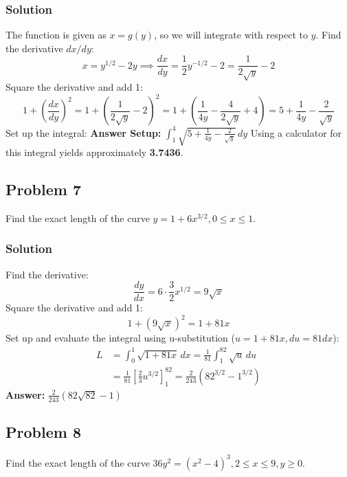 \documentclass{article}
\begin{document}
\subsubsection*{Solution}
The function is given as $ x = g(y) $, so we will integrate with respect to $y$.
Find the derivative $ dx/dy $:
\[ x = y^{1/2} - 2y \implies \frac{dx}{dy} = \frac{1}{2}y^{-1/2} - 2 = \frac{1}{2\sqrt{y}} - 2 \]
Square the derivative and add 1:
\[ 1 + \left(\frac{dx}{dy}\right)^2 = 1 + \left(\frac{1}{2\sqrt{y}} - 2\right)^2 = 1 + \left(\frac{1}{4y} - \frac{4}{2\sqrt{y}} + 4\right) = 5 + \frac{1}{4y} - \frac{2}{\sqrt{y}} \]
Set up the integral:
\textbf{Answer Setup:} $ \int_{1}^{4} \sqrt{5 + \frac{1}{4y} - \frac{2}{\sqrt{y}}} \,dy $
Using a calculator for this integral yields approximately \textbf{3.7436}.

\subsection{Problem 7}
Find the exact length of the curve $ y = 1 + 6x^{3/2}, 0 \le x \le 1 $.
\subsubsection*{Solution}
Find the derivative:
\[ \frac{dy}{dx} = 6 \cdot \frac{3}{2}x^{1/2} = 9\sqrt{x} \]
Square the derivative and add 1:
\[ 1 + (9\sqrt{x})^2 = 1 + 81x \]
Set up and evaluate the integral using u-substitution ($ u = 1+81x, du = 81dx $):
\begin{align*}
    L &= \int_{0}^{1} \sqrt{1+81x} \,dx = \frac{1}{81} \int_{1}^{82} \sqrt{u} \,du \\
    &= \frac{1}{81} \left[ \frac{2}{3}u^{3/2} \right]_{1}^{82} = \frac{2}{243} (82^{3/2} - 1^{3/2})
\end{align*}
\textbf{Answer:} $ \frac{2}{243}(82\sqrt{82} - 1) $

\subsection{Problem 8}
Find the exact length of the curve $ 36y^2 = (x^2-4)^3, 2 \le x \le 9, y \ge 0 $.
\end{document}
